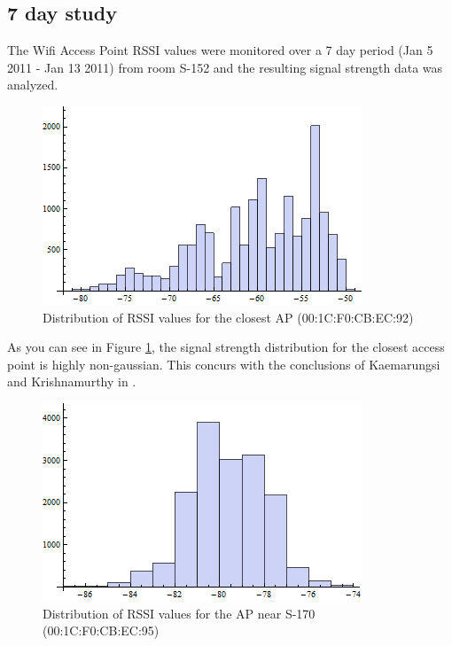 \subsection{7 day study}

The Wifi Access Point RSSI values were monitored over a 7 day period 
(Jan 5 2011 - Jan 13 2011) from room S-152 and the resulting signal strength 
data was analyzed.

\begin{figure}\centering
    \includegraphics{figures/histogram_00_1C_F0_CB_EC_92.png}
    \caption{Distribution of RSSI values for the closest AP (00:1C:F0:CB:EC:92) \label{fig:histogram_00_1C_F0_CB_EC_92}}
\end{figure}

As you can see in Figure \ref{fig:histogram_00_1C_F0_CB_EC_92}, the signal 
strength distribution for the closest access point is highly non-gaussian. This
concurs with the conclusions of Kaemarungsi and Krishnamurthy in \cite{KStats}.

\begin{figure}\centering
    \includegraphics{figures/histogram_00_1C_F0_CB_EC_95.png}
    \caption{Distribution of RSSI values for the AP near S-170 (00:1C:F0:CB:EC:95) \label{fig:histogram_00_1C_F0_CB_EC_95}}
\end{figure}

